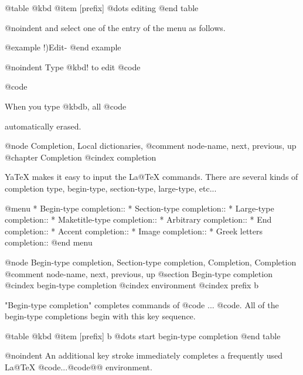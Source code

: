 {{{{{{{{{{{{{{{{{{@table @kbd
@item [prefix] %
        @dots{} editing %
@end table

@noindent
and select one of the entry of the menu as follows.

@example
        !)Edit-%
@end example

@noindent
Type @kbd{!} to edit @code{%
@code{%
When you type @kbd{b}, all @code{%
automatically erased.

@node Completion, Local dictionaries, %
@comment  node-name,  next,  previous,  up
@chapter Completion
@cindex completion

  YaTeX makes it easy to input the La@TeX{} commands.  There are several
kinds of completion type, begin-type, section-type, large-type, etc...

@menu
* Begin-type completion::       
* Section-type completion::     
* Large-type completion::       
* Maketitle-type completion::   
* Arbitrary completion::        
* End completion::              
* Accent completion::           
* Image completion::            
* Greek letters completion::    
@end menu

@node Begin-type completion, Section-type completion, Completion, Completion
@comment  node-name,  next,  previous,  up
@section Begin-type completion
@cindex begin-type completion
@cindex environment
@cindex prefix b

  "Begin-type completion" completes commands of @code{} ... 
@code{}.  All of the begin-type completions begin with this key
sequence.

@table @kbd
@item [prefix] b
        @dots{} start begin-type completion
@end table

@noindent
An additional key  stroke immediately  completes a frequently used
La@TeX{} @code{}...@code{@{@}} environment.

}}}}}}}}}}}}}}}}}}}}}
